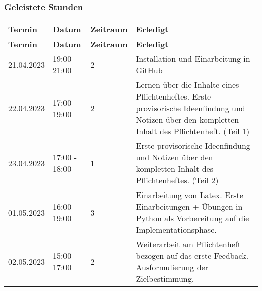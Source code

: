 \subsubsection{Geleistete Stunden}
\begin{flushleft}
		\begin{longtable}{p{2cm}p{}p{2cm}p{}}
            \toprule
            \textbf{Termin} & \textbf{Datum} & \textbf{Zeitraum} & \textbf{Erledigt}\\
            \midrule\endfirsthead
            \toprule
            \textbf{Termin} & \textbf{Datum} & \textbf{Zeitraum} & \textbf{Erledigt}\\
            \midrule\endhead
            	21.04.2023 & 19:00 - 21:00 & 2 & Installation und Einarbeitung in GitHub\\ \midrule
				22.04.2023 & 17:00 - 19:00 & 2 & Lernen über die Inhalte eines Pflichtenheftes. Erste provisorische Ideenfindung und Notizen über den kompletten Inhalt des Pflichtenheft. (Teil 1) \\ \midrule
				23.04.2023 & 17:00 - 18:00 & 1 & Erste provisorische Ideenfindung und Notizen über den kompletten Inhalt des Pflichtenheftes. (Teil 2) \\ \midrule
				01.05.2023 & 16:00 - 19:00 & 3 & Einarbeitung von Latex. Erste Einarbeitungen + Übungen in Python als Vorbereitung auf die Implementationsphase. \\ \midrule
	 			02.05.2023 & 15:00 - 17:00 & 2 & Weiterarbeit am Pflichtenheft bezogen auf das erste Feedback. Ausformulierung der Zielbestimmung.  \\
            \bottomrule
    \end{longtable}
\end{flushleft}
